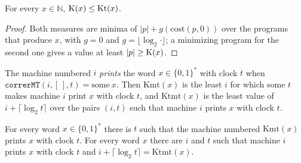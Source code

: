 \begin{theorem}
  \label{thm:information-k-le-kt}
  \leanok
  For every $x \in \mathbb{N}$, $\mathrm{K}(x) \le \mathrm{Kt}(x)$.
\end{theorem}

\begin{proof}
  \leanok
  Both measures are minima of $|p| + g(\mathrm{cost}(p,0))$ over the programs that produce $x$, with
  $g = 0$ and $g = \lfloor \log_2 \cdot \rfloor$; a minimizing program for the second one gives a
  value at least $|p| \ge \mathrm{K}(x)$.
\end{proof}

\begin{definition}
  \label{def:information-machine-k}
  \leanok
  The machine numbered $i$ \emph{prints} the word $x \in \{0,1\}^*$ with clock $t$ when
  $\texttt{correrMT}(i, [\,], t) = \mathrm{some}\ x$. Then $\mathrm{Kmt}(x)$ is the least $i$ for
  which some $t$ makes machine $i$ print $x$ with clock $t$, and $\mathrm{Ktmt}(x)$ is the least
  value of $i + \lceil \log_2 t \rceil$ over the pairs $(i, t)$ such that machine $i$ prints $x$
  with clock $t$.
\end{definition}

\begin{theorem}
  \label{thm:information-kmt-spec}
  \leanok
  For every word $x \in \{0,1\}^*$ there is $t$ such that the machine numbered $\mathrm{Kmt}(x)$
  prints $x$ with clock $t$. For every word $x$ there are $i$ and $t$ such that machine $i$ prints
  $x$ with clock $t$ and $i + \lceil \log_2 t \rceil = \mathrm{Ktmt}(x)$.
\end{theorem}

